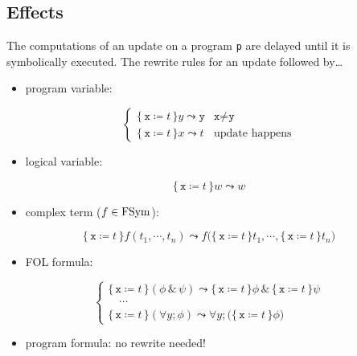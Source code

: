 	\subsection{Effects}
		The computations of an update on a program \texttt{p} are delayed until it is symbolically executed. The rewrite rules for an update followed by\dots
		\begin{itemize}
			\item program variable:
		\end{itemize}
		\begin{equation*}
			\begin{cases}
				\{\, \texttt{x} \coloneqq t \,\} y \leadsto \texttt{y} & \texttt{x} \neq \texttt{y} \\
				\{\, \texttt{x} \coloneqq t \,\} x \leadsto t          & \textrm{update happens}
			\end{cases}
		\end{equation*}
		\begin{itemize}
			\item logical variable:
		\end{itemize}
		\begin{equation*}
			\{\, \texttt{x} \coloneqq t \,\} w \leadsto w
		\end{equation*}
		\begin{itemize}
			\item complex term (\( f \in \operatorname{FSym} \)):
		\end{itemize}
		\begin{equation*}
			\{\, \texttt{x} \coloneqq t \,\} f(t_1, \cdots, t_n) \leadsto f\big( \{\, \texttt{x} \coloneqq t \,\} t_1, \cdots, \{\, \texttt{x} \coloneqq t \,\} t_n \big)
		\end{equation*}
		\begin{itemize}
			\item FOL formula:
		\end{itemize}
		\begin{equation*}
			\begin{cases}
				\{\, \texttt{x} \coloneqq t \,\} (\phi \,\&\, \psi) \leadsto \{\, \texttt{x} \coloneqq t \,\} \phi \,\&\, \{\, \texttt{x} \coloneqq t \,\} \psi \\
				\quad\cdots                                                                                                                                     \\
				\{\, \texttt{x} \coloneqq t \,\} (\forall y; \phi) \leadsto \forall y; \big( \{\, \texttt{x} \coloneqq t \,\} \phi \big)
			\end{cases}
		\end{equation*}
		\begin{itemize}
			\item program formula: no rewrite needed!
		\end{itemize}

